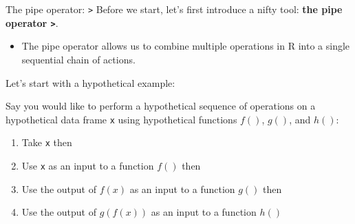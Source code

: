 \documentclass[
  ignorenonframetext,
]{beamer}
\providecommand{\tightlist}{%
  \setlength{\itemsep}{0pt}\setlength{\parskip}{0pt}}
\begin{document}
\begin{frame}[fragile]{The pipe operator:
\texttt{\textbar{}\textgreater{}}}
\label{the-pipe-operator}
Before we start, let's first introduce a nifty tool: \textbf{the pipe
operator \texttt{\textbar{}\textgreater{}}}.

\begin{itemize}
\tightlist
\item
  The pipe operator allows us to combine multiple operations in R into a
  single sequential chain of actions.
\end{itemize}

Let's start with a hypothetical example:

Say you would like to perform a hypothetical sequence of operations on a
hypothetical data frame \texttt{x} using hypothetical functions \(f()\),
\(g()\), and \(h()\):

\begin{enumerate}
\tightlist
\item
  Take \texttt{x} then
\item
  Use \texttt{x} as an input to a function \(f()\) then
\item
  Use the output of \(f(x)\) as an input to a function \(g()\) then
\item
  Use the output of \(g(f(x))\) as an input to a function \(h()\)
\end{enumerate}
\end{frame}
\end{document}
